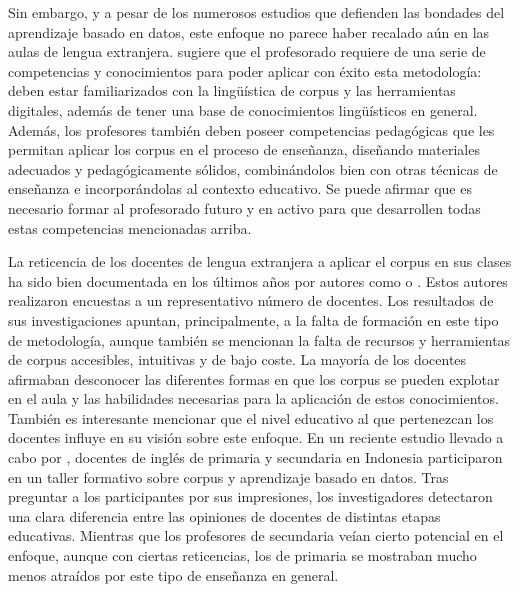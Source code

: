 Sin embargo, y a pesar de los numerosos estudios que defienden las
bondades del aprendizaje basado en datos, este enfoque no parece haber
recalado aún en las aulas de lengua extranjera. \textcite{callies2016towards} sugiere
que el profesorado requiere de una serie de competencias y conocimientos
para poder aplicar con éxito esta metodología: deben estar
familiarizados con la lingüística de corpus y las herramientas
digitales, además de tener una base de conocimientos lingüísticos en
general. Además, los profesores también deben poseer competencias
pedagógicas que les permitan aplicar los corpus en el proceso de
enseñanza, diseñando materiales adecuados y pedagógicamente sólidos,
combinándolos bien con otras técnicas de enseñanza e incorporándolas al
contexto educativo. Se puede afirmar que es necesario formar al
profesorado futuro y en activo para que desarrollen todas estas
competencias mencionadas arriba.

La reticencia de los docentes de lengua extranjera a aplicar el corpus
en sus clases ha sido bien documentada en los últimos años por autores
como \textcite{romer2009corpus} o \textcite{tribble2015teaching}. Estos autores realizaron encuestas a
un representativo número de docentes. Los resultados de sus
investigaciones apuntan, principalmente, a la falta de formación en este
tipo de metodología, aunque también se mencionan la falta de recursos y
herramientas de corpus accesibles, intuitivas y de bajo coste. La
mayoría de los docentes afirmaban desconocer las diferentes formas en
que los corpus se pueden explotar en el aula y las habilidades
necesarias para la aplicación de estos conocimientos. También es
interesante mencionar que el nivel educativo al que pertenezcan los
docentes influye en su visión sobre este enfoque. En un reciente estudio
llevado a cabo por \textcite{crosthwaite2021voices}, docentes de inglés de
primaria y secundaria en Indonesia participaron en un taller formativo
sobre corpus y aprendizaje basado en datos. Tras preguntar a los
participantes por sus impresiones, los investigadores detectaron una
clara diferencia entre las opiniones de docentes de distintas etapas
educativas. Mientras que los profesores de secundaria veían cierto
potencial en el enfoque, aunque con ciertas reticencias, los de primaria
se mostraban mucho menos atraídos por este tipo de enseñanza en general.

